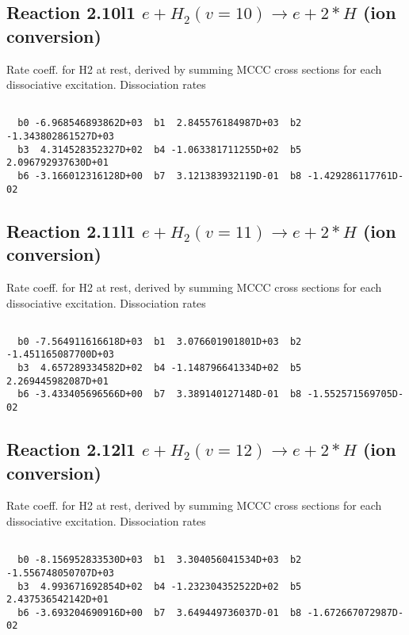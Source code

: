 \newpage
\subsection{
Reaction 2.10l1
$ e + H_2(v=10) \rightarrow e + 2*H $ (ion conversion)
}
Rate coeff. for H2 at rest, derived by summing MCCC cross sections for each dissociative excitation.
Dissociation rates 

\begin{small}\begin{verbatim}

  b0 -6.968546893862D+03  b1  2.845576184987D+03  b2 -1.343802861527D+03
  b3  4.314528352327D+02  b4 -1.063381711255D+02  b5  2.096792937630D+01
  b6 -3.166012316128D+00  b7  3.121383932119D-01  b8 -1.429286117761D-02

\end{verbatim}\end{small}

\newpage
\subsection{
Reaction 2.11l1
$ e + H_2(v=11) \rightarrow e + 2*H $ (ion conversion)
}
Rate coeff. for H2 at rest, derived by summing MCCC cross sections for each dissociative excitation.
Dissociation rates 

\begin{small}\begin{verbatim}

  b0 -7.564911616618D+03  b1  3.076601901801D+03  b2 -1.451165087700D+03
  b3  4.657289334582D+02  b4 -1.148796641334D+02  b5  2.269445982087D+01
  b6 -3.433405696566D+00  b7  3.389140127148D-01  b8 -1.552571569705D-02

\end{verbatim}\end{small}

\newpage
\subsection{
Reaction 2.12l1
$ e + H_2(v=12) \rightarrow e + 2*H $ (ion conversion)
}
Rate coeff. for H2 at rest, derived by summing MCCC cross sections for each dissociative excitation.
Dissociation rates 

\begin{small}\begin{verbatim}

  b0 -8.156952833530D+03  b1  3.304056041534D+03  b2 -1.556748050707D+03
  b3  4.993671692854D+02  b4 -1.232304352522D+02  b5  2.437536542142D+01
  b6 -3.693204690916D+00  b7  3.649449736037D-01  b8 -1.672667072987D-02

\end{verbatim}\end{small}

